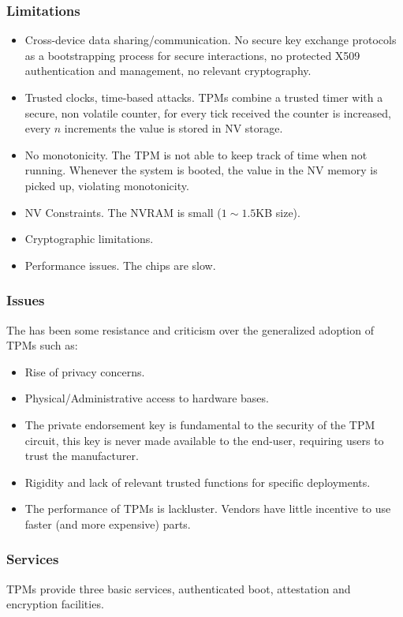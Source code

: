 \subsubsection{Limitations}
\begin{itemize}
    \item Cross-device data sharing/communication. No secure key exchange protocols as a bootstrapping process for secure interactions, no protected X509 authentication and management, no relevant cryptography.
    \item Trusted clocks, time-based attacks.
    TPMs combine a trusted timer with a secure, non volatile counter,
    for every tick received the counter is increased,
    every $n$ increments the value is stored in NV storage.
    \item No monotonicity. The TPM is not able to keep track of time when not running.
    Whenever the system is booted, the value in the NV memory is picked up, violating monotonicity.
    \item NV Constraints. The NVRAM is small ($1\sim1.5$KB size).
    \item Cryptographic limitations.
    \item Performance issues. The chips are slow.
\end{itemize}

\subsubsection{Issues}
The has been some resistance and criticism over the generalized adoption of TPMs such as:
\begin{itemize}
    \item Rise of privacy concerns.
    \item Physical/Administrative access to hardware bases.
    \item The private endorsement key is fundamental to the security of the TPM circuit,
    this key is never made available to the end-user, requiring users to trust the manufacturer.
    \item Rigidity and lack of relevant trusted functions for specific deployments.
    \item The performance of TPMs is lackluster.
    Vendors have little incentive to use faster (and more expensive) parts.
\end{itemize}

\subsubsection{Services}
TPMs provide three basic services, authenticated boot, attestation and encryption facilities.

